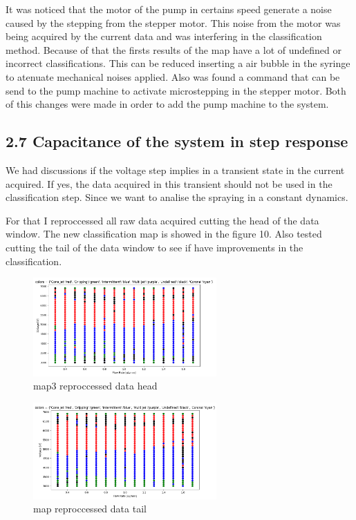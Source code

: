    It was noticed that the motor of the pump in certains speed generate a noise caused by the stepping from the stepper motor.
    This noise from the motor was being acquired by the current data and was interfering in the classification method.
    Because of that the firsts results of the map have a lot of undefined or incorrect classifications.
    This can be reduced inserting a air bubble in the syringe to atenuate mechanical noises applied.
    Also was found a command that can be send to the pump machine to activate microstepping in the stepper motor.
    Both of this changes were made in order to add the pump machine to the system.



\subsection*{2.7 Capacitance of the system in step response}


    We had discussions if the voltage step implies in a transient state in the current acquired.
    If yes, the data acquired in this transient should not be used in the classification step. Since we want to analise
    the spraying in a constant dynamics.

    For that I reproccessed all raw data acquired cutting the head of the data window. The new classification map is showed in the figure 10.
    Also tested cutting the tail of the data window to see if have improvements in the classification.

    \begin{multicols}{2}
        \begin{figure}[H]
            \center
            \includegraphics[width=7cm]{images/map3_reproccessed_data_head.png}
            \caption{ map3 reproccessed data head }
        \end{figure}


        \begin{figure}[H]
            \center
            \includegraphics[width=7cm]{images/map3_reproccessed_data_tail.png}
            \caption{ map reproccessed data tail }
        \end{figure}

    \end{multicols}

